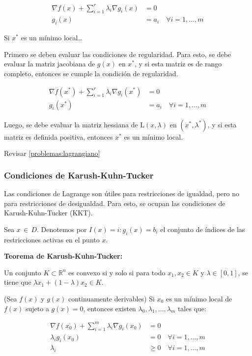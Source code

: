 \documentclass{article}
\begin{document}
\begin{align*}
    \nabla f(x) + \sum_{i=1}^r \lambda_i \nabla g_i(x) & = 0                                  \\
    g_i(x)                                             & = a_i \quad \forall i = 1, \ldots, m
\end{align*}

Si $x^*$ es un mínimo local\dots


Primero se deben evaluar las condiciones de regularidad. Para esto, se debe evaluar la matriz jacobiana de $g(x)$ en $x^*$, y si esta matriz es de rango completo, entonces se cumple la condición de regularidad.

\begin{align*}
    \nabla f(x^*) + \sum_{i=1}^r \lambda_i \nabla g_i(x^*) & = 0                                  \\
    g_i(x^*)                                               & = a_i \quad \forall i = 1, \ldots, m
\end{align*}

Luego, se debe evaluar la matriz hessiana de $\mathrm{L}(x, \lambda)$ en $(x^*, \lambda^*)$, y si esta matriz es definida positiva, entonces $x^*$ es un mínimo local.

Revisar \ref{problemas:lagrangiano}

\subsubsection{Condiciones de Karush-Kuhn-Tucker}

Las condiciones de Lagrange son útiles para restricciones de igualdad, pero no para restricciones de desigualdad. Para esto, se ocupan las condiciones de Karush-Kuhn-Tucker (KKT).

Sea $x \, \in \, D$. Denotemos por $I(x)={i:g_i(x)=b_i}$ el conjunto de índices de las restricciones activas en el punto $x$.

\textbf{Teorema de Karush-Kuhn-Tucker:}

Un conjunto $K \subset \mathbb{R}^n$ es convexo si y solo si para todo $x_1, x_2 \in K$ y $\lambda \in [0, 1]$, se tiene que $\lambda x_1 + (1 - \lambda) x_2 \in K$.

(Sea $f(x)$ y $g(x)$ continuamente derivables) Si $x_0$ es un mínimo local de $f(x)$ sujeto a $g(x) = 0$, entonces existen $\lambda_0, \lambda_1, \ldots, \lambda_m$ tales que:

\begin{align*}
    \nabla f(x_0) + \sum_{i=1}^{m} \lambda_i \nabla g_i(x_0) & = 0                                   \\
    \lambda_i g_i(x_0)                                       & = 0 \quad \forall i = 1, \ldots, m    \\
    \lambda_i                                                & \geq 0 \quad \forall i = 1, \ldots, m
\end{align*}
\end{document}
